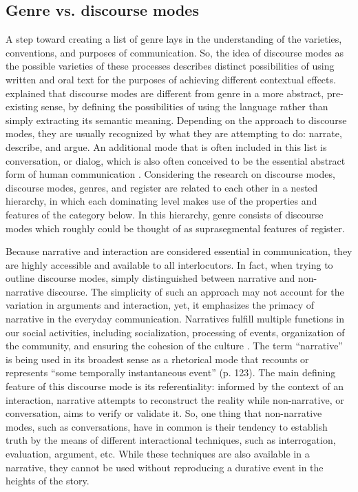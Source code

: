 \documentclass[12pt]{article}
\begin{document}
\subsection{Genre vs. discourse modes}
A step toward creating a list of genre lays in the understanding of the varieties, conventions, and purposes of communication. So, the idea of discourse modes as the possible varieties of these processes describes distinct possibilities of using written and oral text for the purposes of achieving different contextual effects. \textcite[p. 54]{bax2011} explained that discourse modes are different from genre in a more abstract, pre-existing sense, by defining the possibilities of using the language rather than simply extracting its semantic meaning. Depending on the approach to discourse modes, they are usually recognized by what they are attempting to do: narrate, describe, and argue. An additional mode that is often included in this list is conversation, or dialog, which is also often conceived to be the essential abstract form of human communication \parencite{bakhtin1986, bax2011}. Considering the research on discourse modes, discourse modes, genres, and register are related to each other in a nested hierarchy, in which each dominating level makes use of the properties and features of the category below. In this hierarchy, genre consists of discourse modes which roughly could be thought of as suprasegmental features of register.

Because narrative and interaction are considered essential in communication, they are highly accessible and available to all interlocutors.  In fact, when trying to outline discourse modes, \textcite{georgakopoulou2000} simply distinguished between narrative and non-narrative discourse. The simplicity of such an approach may not account for the variation in arguments and interaction, yet, it emphasizes the primacy of narrative in the everyday communication. Narratives fulfill multiple functions in our social activities, including socialization, processing of events, organization of the community, and ensuring the cohesion of the culture \parencite{georgakopoulou2000}. The term ``narrative'' is being used in its broadest sense as a rhetorical mode that recounts or represents ``some temporally instantaneous event'' (p. 123). The main defining feature of this discourse mode is its referentiality: informed by the context of an interaction, narrative attempts to reconstruct the reality while non-narrative, or conversation, aims to verify or validate it. So, one thing that non-narrative modes, such as conversations, have in common is their tendency to establish truth by the means of different interactional techniques, such as interrogation, evaluation, argument, etc. While these techniques are also available in a narrative, they cannot be used without reproducing a durative event in the heights of the story. 
\end{document}
